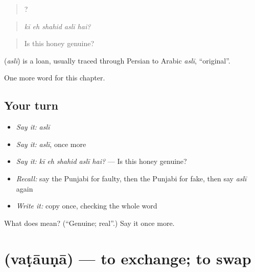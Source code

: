 \begin{quote}
    ?
\end{quote}

\begin{quote}
\emph{kī eh shahid aslī hai?}
\end{quote}

\begin{quote}
Is this honey genuine?
\end{quote}

\begin{cousinweb}
\textbf{} (\emph{aslī}) is a loan, usually traced through Persian to Arabic \emph{aslī}, \textquotedblleft{}original\textquotedblright{}.
\end{cousinweb}

\begin{grammarlens}[title={What you've built}]
One more word for this chapter.
\end{grammarlens}

\subsection*{Your turn}
\begin{itemize}
\raggedright
  \item \emph{Say it:} \emph{aslī}
  \item \emph{Say it:} \emph{aslī}, once more
  \item \emph{Say it:} \emph{kī eh shahid aslī hai?} — Is this honey genuine?
  \item \emph{Recall:} say the Punjabi for faulty, then the Punjabi for fake, then say \emph{aslī} again
  \item \emph{Write it:} copy \textbf{} once, checking the whole word
\end{itemize}

\begin{tcolorbox}[breakable,colback=teal!4,colframe=teal!35!black,title={Before you move on}]
What does  mean? (\textquotedblleft{}Genuine; real\textquotedblright{}.) Say it once more.
\end{tcolorbox}
\section[\texorpdfstring{\pa{ਵਟਾਉਣਾ} (vaṭāuṇā)}{ਵਟਾਉਣਾ (vaṭāuṇā)}]{ (vaṭāuṇā) — to exchange; to swap}

\label{lesson:PA-C279-vatauna}




